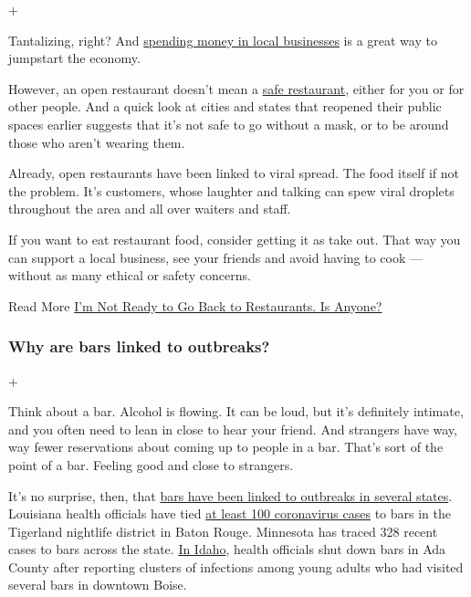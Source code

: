 +

Tantalizing, right? And
\href{https://www.nytimes.com/2020/06/23/dining/outdoor-restaurants-nyc-coronavirus.html}{spending
money in local businesses} is a great way to jumpstart the economy.

However, an open restaurant doesn't mean a
\href{https://www.nytimes.com/2020/05/15/dining/restaurant-opening-safety-coronavirus.html}{safe
restaurant}, either for you or for other people. And a quick look at
cities and states that reopened their public spaces earlier suggests
that it's not safe to go without a mask, or to be around those who
aren't wearing them.

Already, open restaurants have been linked to viral spread. The food
itself if not the problem. It's customers, whose laughter and talking
can spew viral droplets throughout the area and all over waiters and
staff.

If you want to eat restaurant food, consider getting it as take out.
That way you can support a local business, see your friends and avoid
having to cook --- without as many ethical or safety concerns.

 Read More
\href{https://www.nytimes.com/2020/06/30/dining/restaurant-risks-coronavirus.html}{I'm
Not Ready to Go Back to Restaurants. Is Anyone?}

\hypertarget{why-are-bars-linked-to-outbreaks}{%
\subsubsection{Why are bars linked to
outbreaks?}\label{why-are-bars-linked-to-outbreaks}}

+

Think about a bar. Alcohol is flowing. It can be loud, but it's
definitely intimate, and you often need to lean in close to hear your
friend. And strangers have way, way fewer reservations about coming up
to people in a bar. That's sort of the point of a bar. Feeling good and
close to strangers.

It's no surprise, then, that
\href{https://www.nytimes.com/2020/06/25/well/live/coronavirus-spread-bars-transmission.html}{bars
have been linked to outbreaks in several states}. Louisiana health
officials have tied
\href{https://www.nytimes.com/2020/06/22/us/new-coronavirus-phase.html}{at
least 100 coronavirus cases} to bars in the Tigerland nightlife district
in Baton Rouge. Minnesota has traced 328 recent cases to bars across the
state.
\href{https://www.boisestatepublicradio.org/post/bars-large-venues-close-ada-county-after-surge-coronavirus-prompts-rollback\#stream/0}{In
Idaho}, health officials shut down bars in Ada County after reporting
clusters of infections among young adults who had visited several bars
in downtown Boise.

